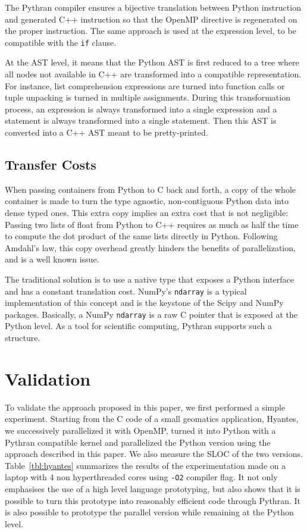 \documentclass{llncs}
\begin{document}
The Pythran compiler ensures a bijective translation between Python instruction
and generated C++ instruction so that the OpenMP directive is regenerated on the
proper instruction. The same approach is used at the expression level, to be
compatible with the \texttt{if} clause.

At the AST level, it means that the Python AST is first reduced to a tree where
all nodes not available in C++ are transformed into a compatible representation.
For instance, list comprehension expressions are turned into function calls or
tuple unpacking is turned in multiple assignments. During this transformation
process, an expression is always transformed into a single expression and a
statement is always transformed into a single statement. Then this AST is
converted into a C++ AST meant to be pretty-printed.


\subsection{Transfer Costs}

When passing containers from Python to C back and forth, a copy of the whole
container is made to turn the type agnostic, non-contiguous Python data into
dense typed ones. This extra copy implies an extra cost that is not negligible:
Passing two lists of float from Python to C++ requires as much as half the time
to compute the dot product of the same lists directly in Python. Following
Amdahl's law, this copy overhead greatly hinders the benefits of
parallelization, and is a well known issue.

The traditional solution is to use a native type that exposes a Python interface
and has a constant translation cost. NumPy's \texttt{ndarray} is a typical
implementation of this concept and is the keystone of the Scipy and NumPy
packages. Basically, a NumPy \texttt{ndarray} is a raw C pointer that is exposed
at the Python level. As a tool for scientific computing, Pythran supports such a
structure.

\section{Validation}\label{sec:validation}

To validate the approach proposed in this paper, we first performed a simple
experiment. Starting from the C code of a small geomatics application, Hyantes,
we successively parallelized it with OpenMP, turned it into Python with a
Pythran compatible kernel and parallelized the Python version using the approach
described in this paper. We also measure the SLOC of the two versions. 
Table~\ref{tbl:hyantes} summarizes the results of the experimentation made on a
laptop with 4 non hyperthreaded cores using \texttt{-O2} compiler flag. It not
only emphasises the use of a high level language prototyping, but also shows
that it is possible to turn this prototype into reasonably efficient code
through Pythran. It is also possible to prototype the parallel version while
remaining at the Python level.
\end{document}
